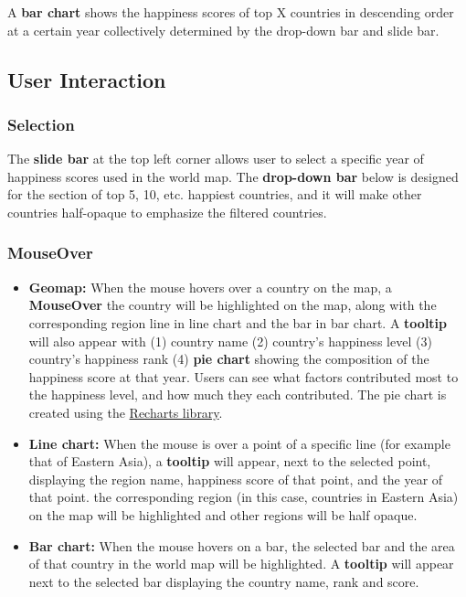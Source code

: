 \documentclass{article}
\begin{document}
A \textbf{bar chart} shows the happiness scores of top X countries in descending order at a certain year collectively determined by the drop-down bar and slide bar.


\subsection{User Interaction}
\subsubsection{Selection}
The \textbf{slide bar} at the top left corner allows user to select a specific year of happiness scores used in the world map. The \textbf{drop-down bar} below is designed for the section of top 5, 10, etc. happiest countries, and it will make other countries half-opaque to emphasize the filtered countries.

\subsubsection{MouseOver}
\begin{itemize}
    \item \textbf{Geomap:} When the mouse hovers over a country on the map, a \textbf{MouseOver} the country will be highlighted on the map, along with the corresponding region line in line chart and the bar in bar chart. A \textbf{tooltip} will also appear with (1) country name (2) country's happiness level (3) country's happiness rank (4) \textbf{pie chart} showing the composition of the happiness score at that year. Users can see what factors contributed most to the happiness level, and how much they each contributed. The pie chart is created using the \href{https://recharts.org/en-US/}{Recharts library}. 
    
    \item \noindent \textbf{Line chart:} When the mouse is over a point of a specific line (for example that of Eastern Asia), a \textbf{tooltip} will appear, next to the selected point, displaying the region name, happiness score of that point, and the year of that point. the corresponding region (in this case, countries in Eastern Asia) on the map will be highlighted and other regions will be half opaque. 

\item \noindent \textbf{Bar chart:} When the mouse hovers on a bar, the selected bar and the area of that country in the world map will be highlighted. A \textbf{tooltip} will appear next to the selected bar displaying the country name, rank and score.
\end{itemize}
\end{document}
